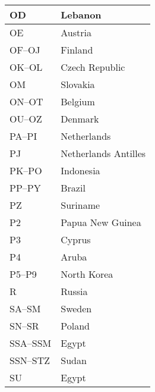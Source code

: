 \begin{longtable}{|l|l|}
  \hline
  OD                  & Lebanon                                   \\
  \hline
  OE                  & Austria                                   \\
  \hline
  OF--OJ              & Finland                                   \\
  \hline
  OK--OL              & Czech Republic                            \\
  \hline
  OM                  & Slovakia                                  \\
  \hline
  ON--OT              & Belgium                                   \\
  \hline
  OU--OZ              & Denmark                                   \\
  \hline
  PA--PI              & Netherlands                               \\
  \hline
  PJ                  & Netherlands Antilles                      \\
  \hline
  PK--PO              & Indonesia                                 \\
  \hline
  PP--PY              & Brazil                                    \\
  \hline
  PZ                  & Suriname                                  \\
  \hline
  P2                  & Papua New Guinea                          \\
  \hline
  P3                  & Cyprus                                    \\
  \hline
  P4                  & Aruba                                     \\
  \hline
  P5--P9              & North Korea                               \\
  \hline
  R                   & Russia                                    \\
  \hline
  SA--SM              & Sweden                                    \\
  \hline
  SN--SR              & Poland                                    \\
  \hline
  SSA--SSM            & Egypt                                     \\
  \hline
  SSN--STZ            & Sudan                                     \\
  \hline
  SU                  & Egypt                                     \\
  \hline

\end{longtable}
